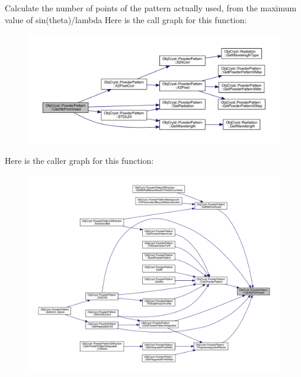 Calculate the number of points of the pattern actually used, from the maximum value of sin(theta)/lambda Here is the call graph for this function\+:
\nopagebreak
\begin{figure}[H]
\begin{center}
\leavevmode
\includegraphics[width=350pt]{class_obj_cryst_1_1_powder_pattern_a41398431ff5bc35f99d47224c3d4a6ec_cgraph}
\end{center}
\end{figure}
Here is the caller graph for this function\+:
\nopagebreak
\begin{figure}[H]
\begin{center}
\leavevmode
\includegraphics[width=350pt]{class_obj_cryst_1_1_powder_pattern_a41398431ff5bc35f99d47224c3d4a6ec_icgraph}
\end{center}
\end{figure}
\mbox{\label{class_obj_cryst_1_1_powder_pattern_a5fbc48a5536415de925a4afbb4e6122b}} 
